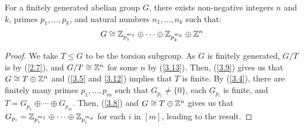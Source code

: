 For a finitely generated abelian group $G$, there exists
non-negative integers $n$ and $k$, primes $p_1, \ldots, p_k$, and
natural numbers $n_1, \ldots, n_k$ such that: \begin{align*}
    G \cong \mathbb{Z}_{p_1^{m_1}} \oplus \cdots 
    \oplus \mathbb{Z}_{p_k^{m_k}} \oplus \mathbb{Z}^n
\end{align*}

\begin{proof}
    We take $T \leq G$ to be the torsion subgroup. As $G$ is finitely generated,
    $G / T$ is by (\ref{2.7}), and $G / T \cong \mathbb{Z}^n$ for some
    $n$ by (\ref{3.13}). Then, (\ref{3.9}) gives us that $G \cong T \oplus \mathbb{Z}^n$
    and (\ref{3.5} and \ref{3.12}) implies that $T$ is finite. 
    By (\ref{3.4}), there are finitely many primes $p_1, \ldots, p_m$ such that
    $G_{p_i} \neq \{0\}$, each $G_{p_i}$ is finite, and 
    $T = G_{p_1} \oplus \cdots \oplus G_{p_m}$. Then, (\ref{3.8}) and $G \cong T \oplus \mathbb{Z}^n$
    gives us that $G_{p_i} = \mathbb{Z}_{p_i^{m_1}} \oplus \cdots \oplus \mathbb{Z}_{p_i^{m_d}}$
    for each $i$ in $[m]$, leading to the result.
\end{proof}
